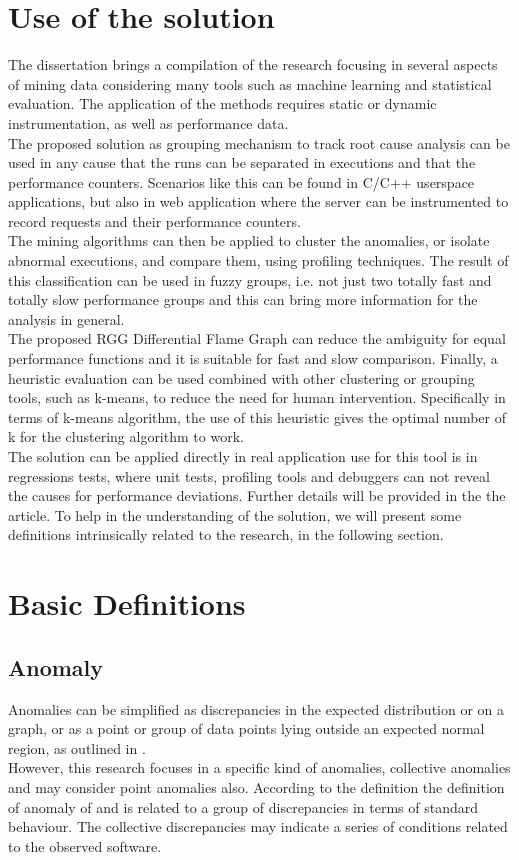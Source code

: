 \section{Use of the solution}  %
The dissertation brings a compilation of the research focusing in several aspects of mining data considering many tools such as machine learning and statistical evaluation. The application of the methods requires static or dynamic instrumentation, as well as performance data.\\
The proposed solution as grouping mechanism to track root cause analysis can be used in any cause that the runs can be separated in executions and that the performance counters. Scenarios like this can be found in C/C++ userspace applications, but also in web application where the server can be instrumented to record requests and their performance counters.\\
The mining algorithms can then be applied to cluster the anomalies, or isolate abnormal executions, and compare them, using profiling techniques. The result of this classification can be used in fuzzy groups, i.e. not just two totally fast and totally slow performance groups and this can bring more information for the analysis in general.\\
The proposed RGG Differential Flame Graph can reduce the ambiguity for equal performance functions and it is suitable for fast and slow comparison. 
Finally, a heuristic evaluation can be used combined with other clustering or grouping tools, such as k-means, to reduce the need for human intervention. Specifically in terms of k-means algorithm, the use of this heuristic gives the optimal number of k for the clustering algorithm to work. \\
The solution can be applied directly in real application use for this tool is in regressions tests, where unit tests, profiling tools and debuggers can not reveal the causes for performance deviations. Further details will be provided in the the article.
To help in the understanding of the solution, we will present some definitions intrinsically related to the research, in the following section.

\section{Basic Definitions}  %

\subsection{Anomaly}
Anomalies can be simplified as discrepancies in the expected distribution or on a graph, or as a point or group of data points lying outside an expected normal region, as outlined in \cite{das_detection}. \\
However, this research focuses in a specific kind of anomalies, collective anomalies and may consider point anomalies also. According to the definition the definition of anomaly of \cite{Chandola2009ADS15418801541882} and is related to a group of discrepancies in terms of standard behaviour. The collective discrepancies may indicate a series of conditions related to the observed software.\\

